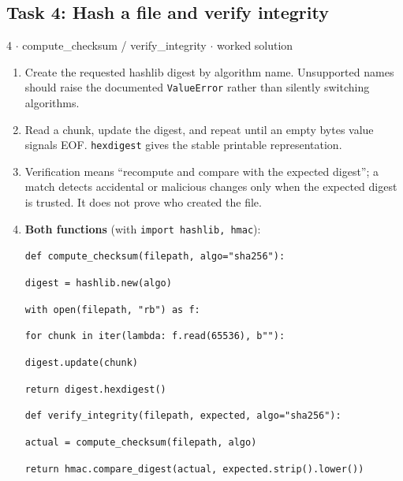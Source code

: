 \documentclass[11pt]{article}
\begin{document}
\begin{keepsection}\subsection{Task 4: Hash a file and verify integrity}

\begin{workedbox}{4 \ensuremath{\cdot} compute\_checksum / verify\_integrity \ensuremath{\cdot} worked solution}
\begin{enumerate}
\item Create the requested hashlib digest by algorithm name. Unsupported names should raise the documented \texttt{ValueError} rather than silently switching algorithms.
\item Read a chunk, update the digest, and repeat until an empty bytes value signals EOF. \texttt{hexdigest} gives the stable printable representation.
\item Verification means “recompute and compare with the expected digest”; a match detects accidental or malicious changes only when the expected digest is trusted. It does not prove who created the file.
\item {}
\textbf{Both functions} (with \texttt{import hashlib, hmac}):
\begin{tcolorbox}[colback=Paperblue,colframe=Paperblue,boxrule=0pt,arc=0pt,left=7pt,right=7pt,top=5pt,bottom=5pt]\small\sloppy
\noindent\hspace*{0em}\texttt{def compute\_checksum(filepath, algo="sha256"):}\par
\noindent\hspace*{1em}\texttt{digest = hashlib.new(algo)}\par
\noindent\hspace*{1em}\texttt{with open(filepath, "rb") as f:}\par
\noindent\hspace*{3em}\texttt{for chunk in iter(lambda: f.read(65536), b""):}\par
\noindent\hspace*{5em}\texttt{digest.update(chunk)}\par
\noindent\hspace*{1em}\texttt{return digest.hexdigest()}\par
\noindent\hspace*{0em}\texttt{}\par
\noindent\hspace*{0em}\texttt{def verify\_integrity(filepath, expected, algo="sha256"):}\par
\noindent\hspace*{1em}\texttt{actual = compute\_checksum(filepath, algo)}\par
\noindent\hspace*{1em}\texttt{return hmac.compare\_digest(actual, expected.strip().lower())}\par
\end{tcolorbox}
\end{enumerate}
\end{workedbox}

\end{keepsection}
\end{document}
